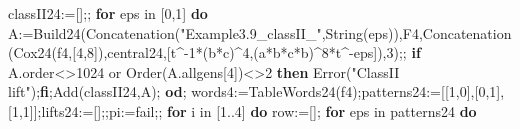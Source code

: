 \documentclass[
  10pt,
  letterpaper,
]{article}
\newenvironment{Shaded}{}{}
\newcommand{\BuiltInTok}[1]{\textcolor[rgb]{0.00,0.50,0.00}{#1}}
\newcommand{\ConstantTok}[1]{\textcolor[rgb]{0.53,0.00,0.00}{#1}}
\newcommand{\ControlFlowTok}[1]{\textcolor[rgb]{0.00,0.44,0.13}{\textbf{#1}}}
\newcommand{\ExtensionTok}[1]{#1}
\newcommand{\FloatTok}[1]{\textcolor[rgb]{0.25,0.63,0.44}{#1}}
\newcommand{\NormalTok}[1]{#1}
\newcommand{\OperatorTok}[1]{\textcolor[rgb]{0.40,0.40,0.40}{#1}}
\newcommand{\StringTok}[1]{\textcolor[rgb]{0.25,0.44,0.63}{#1}}
\newcommand{\VariableTok}[1]{\textcolor[rgb]{0.10,0.09,0.49}{#1}}
\begin{document}
\begin{Shaded}
\begin{Highlighting}[]
\VariableTok{classII24}\OperatorTok{:=}\NormalTok{[]}\OperatorTok{;;}
\ControlFlowTok{for} \VariableTok{eps} \ExtensionTok{in}\NormalTok{ [}\FloatTok{0}\OperatorTok{,}\FloatTok{1}\NormalTok{] }\ControlFlowTok{do}
 \VariableTok{A}\OperatorTok{:=}\VariableTok{Build24}\NormalTok{(}\BuiltInTok{Concatenation}\NormalTok{(}\StringTok{"Example3.9\_classII\_"}\OperatorTok{,}\BuiltInTok{String}\NormalTok{(}\VariableTok{eps}\NormalTok{))}\OperatorTok{,}\VariableTok{F4}\OperatorTok{,}\BuiltInTok{Concatenation}\NormalTok{(}\VariableTok{Cox24}\NormalTok{(}\VariableTok{f4}\OperatorTok{,}\NormalTok{[}\FloatTok{4}\OperatorTok{,}\FloatTok{8}\NormalTok{])}\OperatorTok{,}\VariableTok{central24}\OperatorTok{,}\NormalTok{[}\VariableTok{t}\OperatorTok{\^{}{-}}\FloatTok{1}\OperatorTok{*}\NormalTok{(}\VariableTok{b}\OperatorTok{*}\VariableTok{c}\NormalTok{)}\OperatorTok{\^{}}\FloatTok{4}\OperatorTok{,}\NormalTok{(}\VariableTok{a}\OperatorTok{*}\VariableTok{b}\OperatorTok{*}\VariableTok{c}\OperatorTok{*}\VariableTok{b}\NormalTok{)}\OperatorTok{\^{}}\FloatTok{8}\OperatorTok{*}\VariableTok{t}\OperatorTok{\^{}{-}}\VariableTok{eps}\NormalTok{])}\OperatorTok{,}\FloatTok{3}\NormalTok{)}\OperatorTok{;;}
 \ControlFlowTok{if} \VariableTok{A}\NormalTok{.}\VariableTok{order}\OperatorTok{\textless{}\textgreater{}}\FloatTok{1024} \ConstantTok{or} \BuiltInTok{Order}\NormalTok{(}\VariableTok{A}\NormalTok{.}\VariableTok{allgens}\NormalTok{[}\FloatTok{4}\NormalTok{])}\OperatorTok{\textless{}\textgreater{}}\FloatTok{2} \ControlFlowTok{then} \BuiltInTok{Error}\NormalTok{(}\StringTok{"ClassII lift"}\NormalTok{)}\OperatorTok{;}\ControlFlowTok{fi}\OperatorTok{;}\BuiltInTok{Add}\NormalTok{(}\VariableTok{classII24}\OperatorTok{,}\VariableTok{A}\NormalTok{)}\OperatorTok{;}
\ControlFlowTok{od}\OperatorTok{;}
\VariableTok{words4}\OperatorTok{:=}\VariableTok{TableWords24}\NormalTok{(}\VariableTok{f4}\NormalTok{)}\OperatorTok{;}\VariableTok{patterns24}\OperatorTok{:=}\NormalTok{[[}\FloatTok{1}\OperatorTok{,}\FloatTok{0}\NormalTok{]}\OperatorTok{,}\NormalTok{[}\FloatTok{0}\OperatorTok{,}\FloatTok{1}\NormalTok{]}\OperatorTok{,}\NormalTok{[}\FloatTok{1}\OperatorTok{,}\FloatTok{1}\NormalTok{]]}\OperatorTok{;}\VariableTok{lifts24}\OperatorTok{:=}\NormalTok{[]}\OperatorTok{;;}\VariableTok{pi}\OperatorTok{:=}\ConstantTok{fail}\OperatorTok{;;}
\ControlFlowTok{for} \VariableTok{i} \ExtensionTok{in}\NormalTok{ [}\FloatTok{1}\OperatorTok{..}\FloatTok{4}\NormalTok{] }\ControlFlowTok{do}
 \VariableTok{row}\OperatorTok{:=}\NormalTok{[]}\OperatorTok{;}
 \ControlFlowTok{for} \VariableTok{eps} \ExtensionTok{in} \VariableTok{patterns24} \ControlFlowTok{do}

\end{Highlighting}
\end{Shaded}
\end{document}
